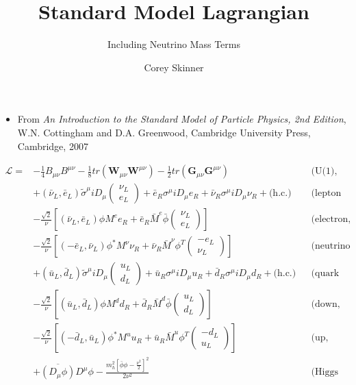 \documentclass[12pt,a4paper,pagesize=pdftex]{scrartcl}
\title{Standard Model Lagrangian}
\subtitle{Including Neutrino Mass Terms}
\author{Corey Skinner}
\date{}
\newcommand{\icol}[1]{%
  \left(\begin{smallmatrix}#1\end{smallmatrix}\right)%
}
\begin{document}
\pdfpageheight 11in
\pdfpagewidth 8.5in

\maketitle

\begin{itemize}
	\item From \textit{An Introduction to the Standard Model of Particle Physics, 2nd Edition}, W.N. Cottingham and D.A. Greenwood, Cambridge University Press, Cambridge, 2007
\end{itemize}

\begin{align*}
	\mathcal{L} = &-\frac{1}{4} B_{\mu\nu}B^{\mu\nu} - \frac{1}{8}tr\left(\mathbf{W}_{\mu\nu}\mathbf{W}^{\mu\nu}\right) - \frac{1}{2}tr\left(\mathbf{G}_{\mu\nu}\mathbf{G}^{\mu\nu}\right) && \text{(U(1), SU(2), and SU(3) gauge terms)} \\
	&+ \left(\bar{\nu}_L,\bar{e}_L\right)\tilde{\sigma}^\mu iD_\mu\icol{\nu_L\\e_L} + \bar{e}_R\sigma^\mu iD_\mu e_R + \bar{\nu}_R\sigma^\mu iD_\mu\nu_R + \text{(h.c.)} && \text{(lepton dynamical term)} \\
	&-\frac{\sqrt{2}}{\nu}\left[\left(\bar{\nu}_L,\bar{e}_L\right)\phi M^ee_R+\bar{e}_R\bar{M}^e\bar{\phi}\icol{\nu_L\\e_L}\right] && \text{(electron, muon, tauon mass term)} \\
	&-\frac{\sqrt{2}}{\nu}\left[\left(-\bar{e}_L,\bar{\nu}_L\right)\phi^{*}M^\nu\nu_R+\bar{\nu}_R\bar{M}^\nu\phi^T\icol{-e_L\\\nu_L}\right] && \text{(neutrino mass term)} \\
	& +\left(\bar{u}_L, \bar{d}_L\right)\tilde{\sigma}^\mu iD_\mu \icol{u_L\\d_L} + \bar{u}_R\sigma^\mu iD_\mu u_R + \bar{d}_R\sigma^\mu iD_\mu d_R + \text{(h.c.)} && \text{(quark dynamical term)} \\
	&- \frac{\sqrt{2}}{\nu}\left[\left(\bar{u}_L,\bar{d}_L\right)\phi M^dd_R+\bar{d}_R\bar{M}^d\bar{\phi}\icol{u_L\\d_L}\right] && \text{(down, strange, bottom mass term)} \\
	&-\frac{\sqrt{2}}{\nu}\left[\left(-\bar{d}_L,\bar{u}_L\right)\phi^{*}M^uu_R+\bar{u}_R\bar{M}^u\phi^T\icol{-d_L\\u_L}\right] && \text{(up, charm, top mass term)} \\
	&+\overline{\left(D_\mu\phi\right)}D^\mu\phi-\frac{m_h^2\left[\bar{\phi}\phi-\frac{\nu^2}{2}\right]^2}{2\nu^2} && \text{(Higgs dynamical and mass term)}
\end{align*}
\end{document}
